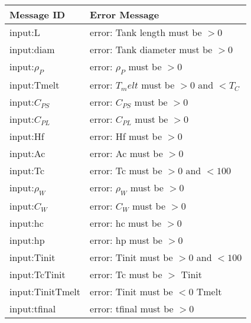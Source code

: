 \documentclass[12pt]{article}
\begin{document}
\begin{table}[!h]
\caption{Possible Exceptions} \label{TblInputVar}
\renewcommand{\arraystretch}{1.2}
\noindent \begin{longtable*}{l l} 
  \toprule
  \textbf{Message ID} & \textbf{Error Message}\\
  \midrule
	input:L &error: Tank length must be $> 0$ \\ 
	input:diam &error: Tank diameter must be $> 0$ \\ 
	input:$\rho_P$ &error: $\rho_P$ must be $> 0$ \\ 
	input:Tmelt &error: $T_melt$ must be $> 0$ and $< T_C$ \\ 
	input:$C_{PS}$ &error: $C_{PS} \text{ must be } > 0$ \\ 
	input:$C_{PL}$ &error: $C_{PL} \text{ must be } > 0$ \\ 
	input:Hf &error: Hf must be $> 0$ \\ 
	input:Ac &error: Ac must be $> 0$ \\ 
	input:Tc &error: Tc must be $> 0 \text{ and } < 100$ \\ 
	input:$\rho_W$ &error: $\rho_W$ must be $> 0$ \\ 
	input:$C_W$ &error: $C_W$ must be $> 0$ \\ 
	input:hc &error: hc must be $> 0$ \\ 
	input:hp &error: hp must be $> 0$ \\ 
	input:Tinit &error: Tinit must be $> 0$ and $< 100$ \\ 
	input:TcTinit &error: Tc must be $>$ Tinit \\ 
	input:TinitTmelt &error: Tinit must be $< 0$ Tmelt \\ 
	input:tfinal &error: tfinal must be $> 0$ \\ 
  \bottomrule
\end{longtable*}
\end{table}
\end{document}
